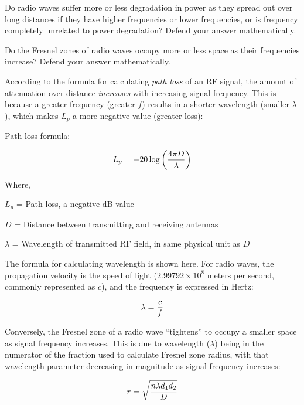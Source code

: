 

Do radio waves suffer more or less degradation in power as they spread out over long distances if they have higher frequencies or lower frequencies, or is frequency completely unrelated to power degradation?  Defend your answer mathematically.

\vskip 10pt

Do the Fresnel zones of radio waves occupy more or less space as their frequencies increase?  Defend your answer mathematically.







According to the formula for calculating {\it path loss} of an RF signal, the amount of attenuation over distance {\it increases} with increasing signal frequency.  This is because a greater frequency (greater $f$) results in a shorter wavelength (smaller $\lambda$), which makes $L_p$ a more negative value (greater loss):

\vskip 10pt

\noindent
Path loss formula:

$$L_p = -20 \log \left(4 \pi D \over \lambda\right)$$

\noindent
Where,

$L_p$ = Path loss, a negative dB value

$D$ = Distance between transmitting and receiving antennas

$\lambda$ = Wavelength of transmitted RF field, in same physical unit as $D$

\vskip 10pt

\noindent
The formula for calculating wavelength is shown here.  For radio waves, the propagation velocity is the speed of light ($2.99792 \times 10^8$ meters per second, commonly represented as $c$), and the frequency is expressed in Hertz:

$$\lambda = {c \over f}$$

\vskip 10pt

\noindent
Conversely, the Fresnel zone of a radio wave ``tightens'' to occupy a smaller space as signal frequency increases.  This is due to wavelength ($\lambda$) being in the numerator of the fraction used to calculate Fresnel zone radius, with that wavelength parameter decreasing in magnitude as signal frequency increases:

$$r = \sqrt{n \lambda d_1 d_2 \over D}$$











